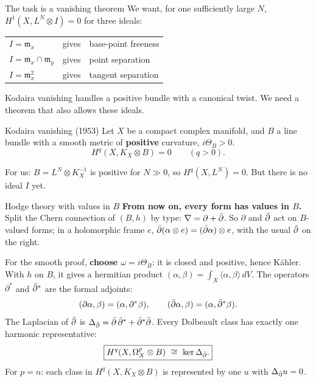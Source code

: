 \begin{frame}{The task is a vanishing theorem}
\label{fr:the-task-is-a-12}
We want, for one sufficiently large \(N\),
\(H^1(X,L^N\otimes I)=0\) for three ideals:
\begin{center}
\renewcommand{\arraystretch}{1.6}
\begin{tabular}{lll}
\(I=\mathfrak m_x\) & gives & base-point freeness\\
\(I=\mathfrak m_x\cap\mathfrak m_y\) & gives & point separation\\
\(I=\mathfrak m_x^2\) & gives & tangent separation
\end{tabular}
\end{center}
Kodaira vanishing handles a positive bundle with a canonical twist.
We need a theorem that also allows these ideals.
\end{frame}

\begin{frame}{Kodaira vanishing (1953)}
Let \(X\) be a compact complex manifold, and \(B\) a line bundle with a smooth metric of \textbf{positive} curvature, \(i\Theta_B>0\).
\[
\boxed{H^q(X,K_X\otimes B)=0\qquad(q>0).}
\]
\par\medskip
For us: \(B=L^N\otimes K_X^{-1}\) is positive for \(N\gg0\), so \(H^q(X,L^N)=0\).
But there is no ideal \(I\) yet.
\end{frame}

\begin{frame}{Hodge theory with values in \(B\)}
\label{fr:hodge-theory-with-values-14}
\textbf{From now on, every form has values in \(B\).}
Split the Chern connection of \((B,h)\) by type: \(\nabla=\partial+\bar\partial\). So \(\partial\) and \(\bar\partial\) act on \(B\)-valued forms; in a holomorphic frame \(e\),
\(\bar\partial(\alpha\otimes e)=(\bar\partial\alpha)\otimes e\), with the usual \(\bar\partial\) on the right.
\par\medskip
For the smooth proof, \textbf{choose \(\omega=i\Theta_B\)}: it is closed and positive, hence Kähler.
With \(h\) on \(B\), it gives a hermitian product
\((\alpha,\beta)=\int_X\langle\alpha,\beta\rangle\,dV\).
The operators \(\partial^*\) and \(\bar\partial^*\) are the formal adjoints:
\[
(\partial\alpha,\beta)=(\alpha,\partial^*\beta),
\qquad
(\bar\partial\alpha,\beta)=(\alpha,\bar\partial^*\beta).
\]
The Laplacian of \(\bar\partial\) is \(\Delta_{\bar\partial}=\bar\partial\,\bar\partial^*+\bar\partial^*\bar\partial\). Every Dolbeault class has exactly one harmonic representative:
\[
\boxed{H^q(X,\Omega^p_X\otimes B)\ \cong\ \ker\Delta_{\db}.}
\]
For \(p=n\): each class in \(H^q(X,K_X\otimes B)\) is represented by one \(u\) with \(\Delta_{\bar\partial}u=0\).
\end{frame}

